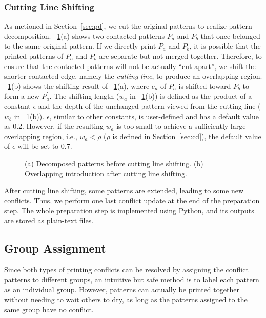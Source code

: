\subsubsection{Cutting Line Shifting}

As metioned in Section~\ref{sec:pd},
we cut the original patterns to realize pattern decomposition.
\figurename~\ref{fig:cld}(a) shows two contacted patterns $P_a$ and $P_b$ that once belonged to the same original pattern.
If we directly print $P_a$ and $P_b$,
it is possible that the printed patterns of $P_a$ and $P_b$ are separate but not merged together.
Therefore, to ensure that the contacted patterns will not be actually ``cut apart'',
we shift the shorter contacted edge, namely the \textit{cutting line},
to produce an overlapping region.
\figurename~\ref{fig:cld}(b) shows the shifting result of \figurename~\ref{fig:cld}(a),
where $e_a$ of $P_a$ is shifted toward $P_b$ to form a new $P_a^\prime$.
The shifting length ($w_a$ in \figurename~\ref{fig:cld}(b))
is defined as the product of a constant $\epsilon$ and the depth of the unchanged pattern viewed from the cutting line
($w_b$ in \figurename~\ref{fig:cld}(b)).
$\epsilon$, similar to other constants,
is user-defined and has a default value as 0.2.
However, if the resulting $w_a$ is too small to achieve a sufficiently large overlapping region,
i.e., $w_a < \rho$ ($\rho$ is defined in Section~\ref{sec:cd}),
the default value of $\epsilon$ will be set to 0.7.

\begin{figure}[t]
	\fontsize{14}{14}  \selectfont
	\centerline{\resizebox{8.5cm}{!}{}}
	\caption{(a) Decomposed patterns before cutting line shifting. (b) Overlapping introduction after cutting line shifting.}
	\label{fig:cld}
	\normalsize
\end{figure}

After cutting line shifting,
some patterns are extended, 
leading to some new conflicts.
Thus, we perform one last conflict update at the end of the preparation step.
The whole preparation step is implemented using Python,
and its outputs are stored as plain-text files.

\subsection{Group Assignment}\label{gro}

Since both types of printing conflicts can be resolved
by assigning the conflict patterns to different groups,
an intuitive but safe method is to label each pattern as an individual group.
However, patterns can actually be printed together without needing to wait others to dry,
as long as the patterns assigned to the same group have no conflict.

